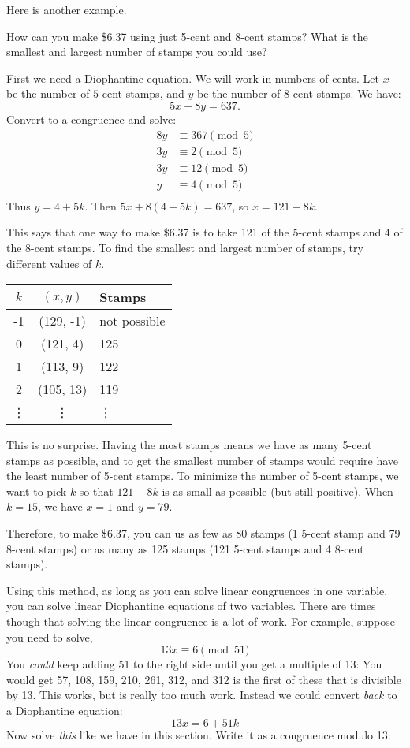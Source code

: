 \documentclass[12pt]{article}
\begin{document}
Here is another example.

\begin{example}
	How can you make \$6.37 using just 5-cent and 8-cent stamps?  What is the smallest and largest number of stamps you could use?
	
	\begin{solution}
		First we need a Diophantine equation.  We will work in numbers of cents.  Let $x$ be the number of $5$-cent stamps, and $y$ be the number of 8-cent stamps.  We have:
		\[5x + 8y = 637.\]
		Convert to a congruence and solve:
		\[
		\begin{aligned}
			8y & \equiv 367 \pmod{5}\\
				3y & \equiv 2 \pmod 5\\
				3y & \equiv 12 \pmod 5\\
				y & \equiv 4 \pmod 5\\
		\end{aligned}
		\]
		Thus $y = 4 + 5k$.  Then $5x + 8(4+5k) = 637$, so $x = 121 - 8k$.
		
		This says that one way to make \$6.37 is to take 121 of the 5-cent stamps and 4 of the 8-cent stamps.  To find the smallest and largest number of stamps, try different values of $k$.
		
		\begin{tabular}{c|c|l}
			$k$ & $(x,y)$ & Stamps\\ \hline
			-1 & (129, -1) & not possible \\
			0 & (121, 4) & 125 \\
			1 & (113, 9) & 122 \\
			2 & (105, 13) & 119 \\
			\vdots & \vdots & \vdots
		\end{tabular}
		
		This is no surprise.  Having the most stamps means we have as many 5-cent stamps as possible, and to get the smallest number of stamps would require have the least number of 5-cent stamps.  To minimize the number of 5-cent stamps, we want to pick $k$ so that $121-8k$ is as small as possible (but still positive).  When $k = 15$, we have $x = 1$ and $y = 79$.
		
		Therefore, to make \$6.37, you can us as few as 80 stamps (1 5-cent stamp and 79 8-cent stamps) or as many as 125 stamps (121 5-cent stamps and 4 8-cent stamps).
	\end{solution}
\end{example}

Using this method, as long as you can solve linear congruences in one variable, you can solve linear Diophantine equations of two variables.  There are times though that solving the linear congruence is a lot of work.  For example, suppose you need to solve,
\[13x \equiv 6 \pmod{51}\]
You {\em could} keep adding 51 to the right side until you get a multiple of 13: You would get 57, 108, 159, 210, 261, 312, and 312 is the first of these that is divisible by 13.  This works, but is really too much work.  Instead we could convert {\em back} to a Diophantine equation:
\[13x = 6 + 51k\]
Now solve {\em this} like we have in this section.  Write it as a congruence modulo 13:
\end{document}
